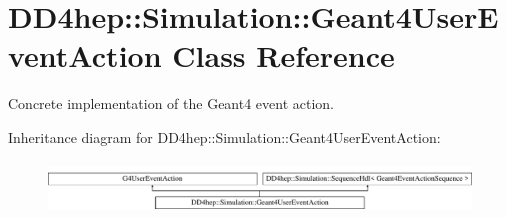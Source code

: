 \hypertarget{class_d_d4hep_1_1_simulation_1_1_geant4_user_event_action}{}\section{D\+D4hep\+:\+:Simulation\+:\+:Geant4\+User\+Event\+Action Class Reference}
\label{class_d_d4hep_1_1_simulation_1_1_geant4_user_event_action}


Concrete implementation of the Geant4 event action.  


Inheritance diagram for D\+D4hep\+:\+:Simulation\+:\+:Geant4\+User\+Event\+Action\+:\begin{figure}[H]
\begin{center}
\leavevmode
\includegraphics[height=1.407035cm]{class_d_d4hep_1_1_simulation_1_1_geant4_user_event_action}
\end{center}
\end{figure}
